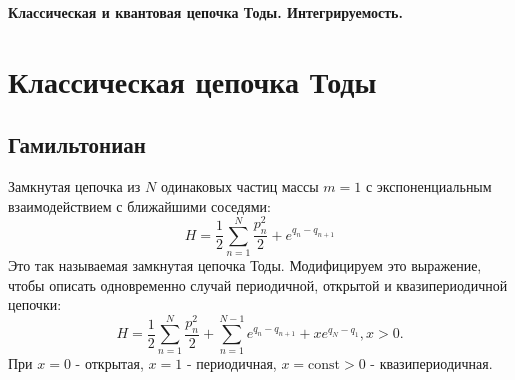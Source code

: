 \documentclass[12pt]{article}
\begin{document}
\begin{center}
\textbf{Классическая и квантовая цепочка Тоды. Интегрируемость.}
\end{center}
\section{Классическая цепочка Тоды}
\subsection{Гамильтониан}
Замкнутая цепочка из $N$ одинаковых частиц массы $m = 1$ с экспоненциальным взаимодействием с ближайшими соседями:
\begin{equation}\label{eq:Tods_hamilt}
    H = \frac{1}{2} \sum_{n = 1}^{N} \frac{p^2_{n}}{2} + e^{q_{n} - q_{n + 1}}
\end{equation}
Это так называемая замкнутая цепочка Тоды. Модифицируем это выражение, чтобы описать одновременно случай периодичной, открытой и квазипериодичной цепочки:
\begin{equation}\label{eq:quasiper_ham}
    H = \frac{1}{2} \sum_{n = 1}^{N} \frac{p^2_{n}}{2} + \sum_{n = 1}^{N - 1} e^{q_{n} - q_{n+1}} + xe^{q_{N} - q_{1}}, x>0. 
\end{equation}
При $x = 0$ - открытая, $x = 1$ - периодичная, $x = \text{const} > 0$ - квазипериодичная.
\end{document}
